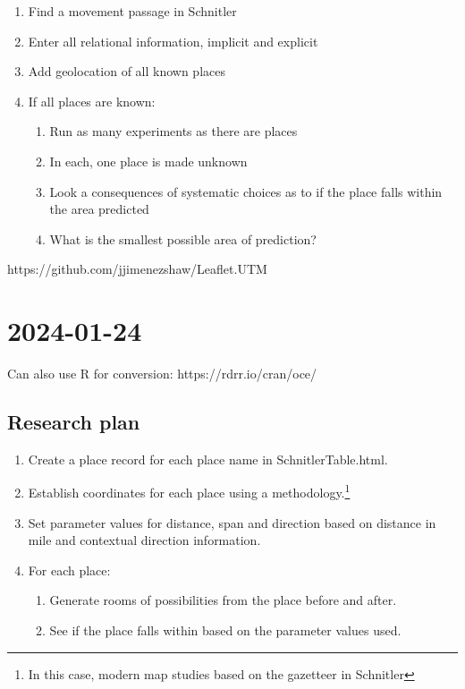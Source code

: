 \documentclass[12pt]{book}
\begin{document}
\begin{enumerate}
\item Find a movement passage in Schnitler
\item Enter all relational information, implicit and explicit
\item Add geolocation of all known places
\item If all places are known:
\begin{enumerate}
\item Run as many experiments as there are places
\item In each, one place is made unknown
\item Look a consequences of systematic choices as to if the place falls within the area predicted
\item What is the smallest possible area of prediction?
\end{enumerate}

\end{enumerate}

https://github.com/jjimenezshaw/Leaflet.UTM

\section{2024-01-24}

Can also use R for conversion: https://rdrr.io/cran/oce/

\subsection{Research plan}

\begin{enumerate}
\item Create a place record for each place name in SchnitlerTable.html.
\item Establish coordinates for each place using a methodology.\footnote{In this case, modern map studies based on the gazetteer in Schnitler}
\item Set parameter values for distance, span and direction based on distance in mile and contextual direction information.
\item For each place:
\begin{enumerate}
\item Generate rooms of possibilities from the place before and after.
\item See if the place falls within based on the parameter values used. 
\end{enumerate}
\end{enumerate}
\end{document}
